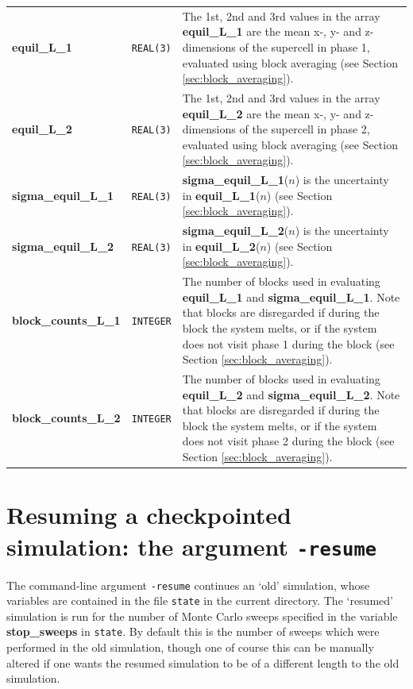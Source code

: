 \documentclass{report}
\begin{document}
\begin{landscape}
\begin{center}
\begin{longtable}{ l l p{8cm}}
\textbf{equil\_L\_1} & \texttt{REAL(3)} & The 1st, 2nd and 3rd values in the array \textbf{equil\_L\_1} are the mean x-, y- and z-dimensions of the
supercell in phase 1, evaluated using block averaging (see Section \ref{sec:block_averaging}). \\
\textbf{equil\_L\_2} & \texttt{REAL(3)} &  The 1st, 2nd and 3rd values in the array \textbf{equil\_L\_2} are the mean x-, y- and z-dimensions of the
supercell in phase 2, evaluated using block averaging (see Section \ref{sec:block_averaging}). \\
\textbf{sigma\_equil\_L\_1} & \texttt{REAL(3)} & \textbf{sigma\_equil\_L\_1}($n$) is the uncertainty in \textbf{equil\_L\_1}($n$) (see Section \ref{sec:block_averaging}). \\
\textbf{sigma\_equil\_L\_2} & \texttt{REAL(3)} & \textbf{sigma\_equil\_L\_2}($n$) is the uncertainty in \textbf{equil\_L\_2}($n$) (see Section \ref{sec:block_averaging}). \\
\textbf{block\_counts\_L\_1} & \texttt{INTEGER} & The number of blocks used in evaluating \textbf{equil\_L\_1} and \textbf{sigma\_equil\_L\_1}. Note that blocks are
disregarded if during the block the system melts, or if the system does not visit phase 1 during the block  (see Section \ref{sec:block_averaging}). \\
\textbf{block\_counts\_L\_2} & \texttt{INTEGER} &  The number of blocks used in evaluating \textbf{equil\_L\_2} and \textbf{sigma\_equil\_L\_2}. Note that blocks are
disregarded if during the block the system melts, or if the system does not visit phase 2 during the block (see Section \ref{sec:block_averaging}). \\
\end{longtable}
\end{center}
\end{landscape}


\section{Resuming a checkpointed simulation: the argument \texttt{-resume}}\label{sec:resume}
The command-line argument \texttt{-resume} continues an `old' simulation, whose variables are contained in the file \texttt{state} in the current 
directory. The `resumed' simulation is run for the number of Monte Carlo sweeps specified in the variable \textbf{stop\_sweeps} in \texttt{state}.
By default this is the number of sweeps which were performed in the old simulation, though one of course this can be manually altered if one wants
the resumed simulation to be of a different length to the old simulation.
\end{document}
